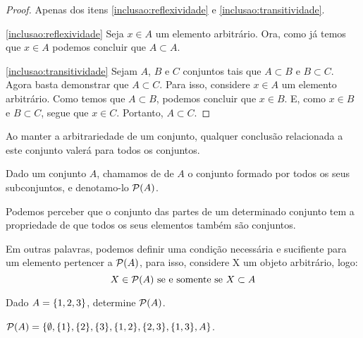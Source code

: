 \begin{proof}
	Apenas dos itens \ref{inclusao:reflexividade} e \ref{inclusao:transitividade}.

	\ref{inclusao:reflexividade}
	Seja $x \in A$ um elemento arbitrário.
	Ora, como já temos que $x \in A$ podemos concluir que $A \subset A$.


	\ref{inclusao:transitividade}
	Sejam $A$, $B$ e $C$ conjuntos tais que $A \subset B$ e $B \subset C$.
	Agora basta demonstrar que $A \subset C$.
	Para isso, considere $x \in A$ um elemento arbitrário.
	Como temos que $A \subset B$, podemos concluir que $x \in B$.
	E, como $x \in B$ e $B \subset C$, segue que $x \in C$.
	Portanto, $A \subset C$.
\end{proof}

\begin{remark}
Ao manter a arbitrariedade de um conjunto, qualquer conclusão relacionada a este conjunto valerá para todos os conjuntos.
\end{remark}

\begin{definition}
\label{def:powerset}
Dado um conjunto $A$, chamamos de  de $A$ o conjunto formado por todos os seus subconjuntos, e denotamo-lo $\mathcal{P}(A)$.
\end{definition}

\begin{remark}
	Podemos perceber que o conjunto das partes de um determinado conjunto tem a propriedade de que todos os seus elementos também são conjuntos.
\end{remark}

Em outras palavras, podemos definir uma condição necessária e sucifiente para um elemento pertencer a $\mathcal{P}(A)$, para isso, considere X um objeto arbitrário, logo:
$$ X \in \mathcal{P}(A) \text{ se e somente se } X \subset A $$

\begin{example}
Dado $A = \left\{ 1,2,3\right\}$, determine $\mathcal{P}(A)$.
\end{example}

\begin{solution}
$\mathcal{P}(A)=\{\emptyset,\{1\}, \{2\}, \{3\}, \{1,2\}, \{2,3\}, \{1,3\},A\}$.
\end{solution}
